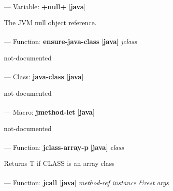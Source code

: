 \paragraph{}
\label{JAVA:+NULL+}
--- Variable: \textbf{+null+} [\textbf{java}] \textit{}

\begin{adjustwidth}{5em}{5em}
The JVM null object reference.
\end{adjustwidth}

\paragraph{}
\label{JAVA:ENSURE-JAVA-CLASS}
--- Function: \textbf{ensure-java-class} [\textbf{java}] \textit{jclass}

\begin{adjustwidth}{5em}{5em}
not-documented
\end{adjustwidth}

\paragraph{}
\label{JAVA:JAVA-CLASS}
--- Class: \textbf{java-class} [\textbf{java}] \textit{}

\begin{adjustwidth}{5em}{5em}
not-documented
\end{adjustwidth}

\paragraph{}
\label{JAVA:JMETHOD-LET}
--- Macro: \textbf{jmethod-let} [\textbf{java}] \textit{}

\begin{adjustwidth}{5em}{5em}
not-documented
\end{adjustwidth}

\paragraph{}
\label{JAVA:JCLASS-ARRAY-P}
--- Function: \textbf{jclass-array-p} [\textbf{java}] \textit{class}

\begin{adjustwidth}{5em}{5em}
Returns T if CLASS is an array class
\end{adjustwidth}

\paragraph{}
\label{JAVA:JCALL}
--- Function: \textbf{jcall} [\textbf{java}] \textit{method-ref instance \&rest args}


